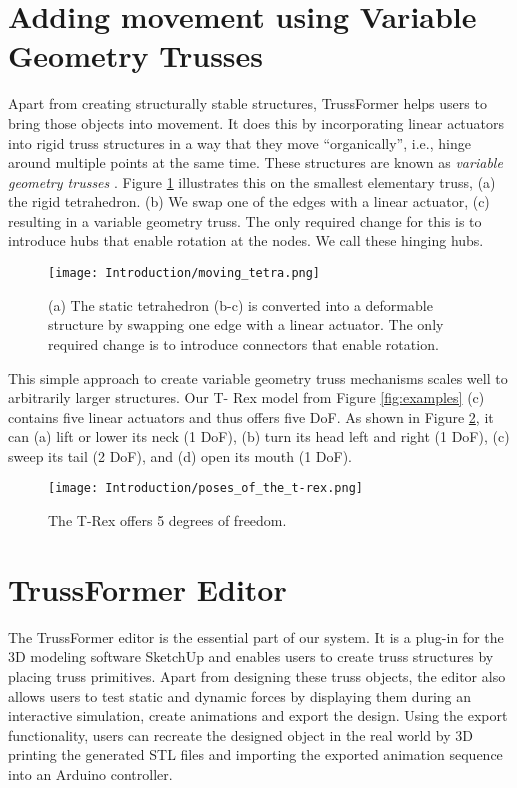 \section{Adding movement using Variable Geometry Trusses}
Apart from creating structurally stable structures, TrussFormer helps users to bring those objects into movement. It does this by incorporating linear actuators into rigid truss structures in a way that they move ``organically'', i.e., hinge around multiple points at the same time. These structures are known as \textit{variable geometry trusses} \cite{reinholtz:1990, rhodes:1985, spinos:2017}.
Figure \ref{fig:moving_tetra} illustrates this on the smallest elementary truss, (a) the rigid tetrahedron. (b) We swap one of the edges with a linear actuator, (c) resulting in a variable geometry truss. The only required change for this is to introduce hubs that enable rotation at the nodes. We call these hinging hubs.
\begin{figure}[h!]
    \texttt{[image: Introduction/moving\_tetra.png]}
    \centering
    \caption{(a) The static tetrahedron (b-c) is converted into a deformable structure by swapping one edge with a linear actuator. The only required change is to introduce connectors that enable rotation.}
    \label{fig:moving_tetra}
\end{figure}
This simple approach to create variable geometry truss mechanisms scales well to arbitrarily larger structures. Our T- Rex model from Figure \ref{fig:examples} (c) contains five linear actuators and thus offers five \ac{DoF}. As shown in Figure \ref{fig:t-rex_poses}, it can (a) lift or lower its neck (1 DoF), (b) turn its head left and right (1 DoF), (c) sweep its tail (2 DoF), and (d) open its mouth (1 DoF).
\begin{figure}[h!]
    \texttt{[image: Introduction/poses\_of\_the\_t-rex.png]}
    \centering
    \caption{The T-Rex offers 5 degrees of freedom.}
    \label{fig:t-rex_poses}
\end{figure}

\section{TrussFormer Editor}
The TrussFormer editor is the essential part of our system. It is a plug-in for the 3D modeling software SketchUp and enables users to create truss structures by placing truss primitives. Apart from designing these truss objects, the editor also allows users to test static and dynamic forces by displaying them during an interactive simulation, create animations and export the design. Using the export functionality, users can recreate the designed object in the real world by 3D printing the generated STL files and importing the exported animation sequence into an Arduino controller.
